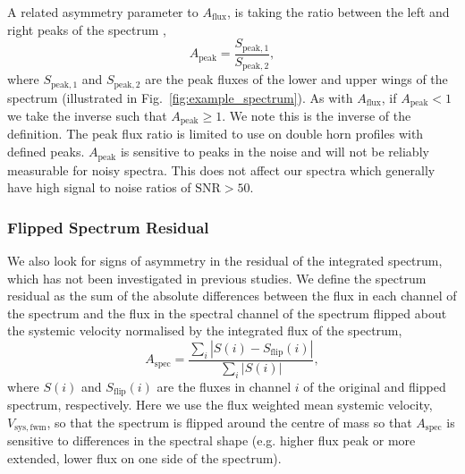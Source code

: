 \documentclass[fleqn,usenatbib]{mnras}
\begin{document}
A related asymmetry parameter to $A_{\mathrm{flux}}$, is taking the ratio between the left and right peaks of the spectrum \citep[e.g. the 'height asymmetry index',][]{Matthews1998}, 
\begin{equation}
	\displaystyle A_{\mathrm{peak}}=\frac{S_{\mathrm{peak,1}}}{S_{\mathrm{peak,2}}},
	\label{equ:peak_asym}
\end{equation}
where $S_{\mathrm{peak,1}}$ and $S_{\mathrm{peak,2}}$ are the peak fluxes of the lower and upper wings of the spectrum (illustrated in Fig.~\ref{fig:example_spectrum}). As with $A_{\mathrm{flux}}$, if $A_{\mathrm{peak}}<1$ we take the inverse such that $A_{\mathrm{peak}}\geq1$. We note this is the inverse of the \cite{Matthews1998} definition. The peak flux ratio is limited to use on double horn profiles with defined peaks. $A_{\mathrm{peak}}$ is sensitive to peaks in the noise and will not be reliably measurable for noisy spectra. This does not affect our spectra which generally have high signal to noise ratios of $\mathrm{SNR}>50$.

\subsubsection{Flipped Spectrum Residual}
\label{ss-sec:spec_res}

We also look for signs of asymmetry in the residual of the integrated spectrum, which has not been investigated in previous studies. We define the spectrum residual as the sum of the absolute differences between the flux in each channel of the spectrum and the flux in the spectral channel of the spectrum flipped about the systemic velocity normalised by the integrated flux of the spectrum,
\begin{equation}
	\displaystyle A_{\mathrm{spec}}=\frac{\sum_{i}|S(i)-S_{\mathrm{flip}}(i)|}{\sum_{i}|S(i)|},
	\label{equ:spec_res}
\end{equation}
where $S(i)$ and $S_{\mathrm{flip}}(i)$ are the fluxes in channel $i$ of the original and flipped spectrum, respectively. Here we use the flux weighted mean systemic velocity, $V_{\mathrm{sys,fwm}}$, so that the spectrum is flipped around the centre of mass so that $A_{\mathrm{spec}}$ is sensitive to differences in the spectral shape (e.g. higher flux peak or more extended, lower flux on one side of the spectrum).


\end{document}
